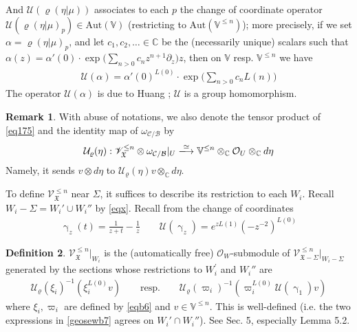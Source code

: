 \documentclass[11pt,b5paper,notitlepage]{article}
\theoremstyle{definition}
\newtheorem{df}{Definition}[subsection]
\newtheorem{rem}[df]{Remark}
\theoremstyle{plain}
\newcommand{\fk}{\mathfrak}
\newcommand{\mc}{\mathcal}
\newcommand{\SV}{\mathscr{V}}
\newcommand{\scr}{\mathscr}
\newcommand{\Vbb}{\mathbb V}
\newcommand{\Cbb}{\mathbb C}
\newcommand{\<}{\left\langle}
\renewcommand{\>}{\right\rangle}
\newcommand{\MO}{\mathcal{O}}
\newcommand{\MU}{\mathcal{U}}
\newcommand{\fx}{\mathfrak{X}}
\numberwithin{equation}{subsection}
\begin{document}
And $\mc U(\varrho(\eta|\mu))$ associates to each $p$ the change of coordinate operator $\mc U(\varrho(\eta|\mu)_p)\in\mathrm{Aut}(\Vbb)$ (restricting to $\mathrm{Aut}(\Vbb^{\leq n})$); more precisely, if we set $\alpha=\varrho(\eta|\mu)_p$, and let $c_1,c_2,\dots\in\Cbb$ be the (necessarily unique) scalars such that $\alpha(z)=\alpha'(0)\cdot\exp\Big(\sum_{n>0}c_nz^{n+1}\partial_z\Big)z$, then on $\Vbb$ resp. $\Vbb^{\leq n}$ we have
\begin{align}
\mc U(\alpha)=\alpha'(0)^{L(0)}\cdot\exp\Big(\sum_{n>0}c_nL(n)\Big)
\end{align}
The operator $\mc U(\alpha)$ is due to Huang \cite{Hua97}; $\mc U$ is a group homomorphism.

\begin{rem}
With abuse of notations, we also denote the tensor product of \eqref{eq175} and the identity map of $\omega_{\mc C/\mc B}$ by
\begin{align}\label{eqb43}
\mc U_\varrho(\eta):\scr V^{\leq n}_\fx\otimes \omega_{\mc C/\mc B}|_U\xlongrightarrow{\simeq}\Vbb^{\leq n}\otimes_\Cbb\mc O_U\otimes_\Cbb d\eta
\end{align}
Namely, it sends $v\otimes d\eta$ to $\mc U_\varrho(\eta)v\otimes_\Cbb d\eta$.
\end{rem}

To define $\scr V_{\fk X}^{\leq n}$ near $\Sigma$, it suffices to describe its restriction to each $W_i$. Recall $W_i-\Sigma=W_i'\cup W_i''$ by \eqref{eqx}. Recall from \cite[Sec. 1.3]{GZ1} the change of coordinates
\begin{gather}\label{eqb87}
\upgamma_z(t)=\frac 1{z+t}-\frac 1z\qquad \mc U(\upgamma_z)=e^{zL(1)}(-z^{-2})^{L(0)}
\end{gather}



\begin{df}\label{lbb45}
$\scr V_{\fk X}^{\leq n}|_{W_i}$ is the (automatically free) $\MO_W$-submodule of $\SV_{\fx-\Sigma}^{\leq n}\vert_{W_i-\Sigma}$ generated by the sections whose restrictions to $W_i^\prime$ and $W_i''$ are 
\begin{align}\label{geosewb7}
    \MU_\varrho(\xi_i)^{-1}(\xi_i^{L(0)}v) \qquad \text{resp.}\qquad \MU_\varrho(\varpi_i)^{-1}(\varpi_i^{L(0)}\MU(\upgamma_1)v)
\end{align}
where $\xi_i,\varpi_i$ are defined by \eqref{eqb6} and $v\in \Vbb^{\leq n}$. This is well-defined (i.e. the two expressions in \eqref{geosewb7} agrees on $W_i'\cap W_i''$). See \cite{Gui-sewingconvergence} Sec. 5, especially Lemma 5.2. 
\end{df}
\end{document}
